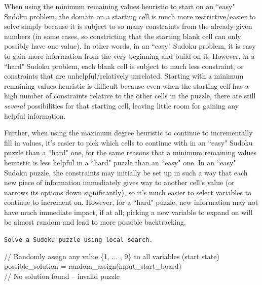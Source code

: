 \documentclass[12pt]{article}
\begin{document}
\begin{enumerate}[label=(\alph*)]
    When using the minimum remaining values heuristic to start on an ``easy" Sudoku problem, the domain on a starting cell is much more restrictive/easier to solve simply because it is subject to so many constraints from the already given numbers (in some cases, so constricting that the starting blank cell can only possibly have one value). In other words, in an ``easy" Sudoku problem, it is easy to gain more information from the very beginning and build on it. However, in a ``hard" Sudoku problem, each blank cell is subject to much less constraint, or constraints that are unhelpful/relatively unrelated. Starting with a minimum remaining values heuristic is difficult because even when the starting cell has a high number of constraints relative to the other cells in the puzzle, there are still \textit{several} possibilities for that starting cell, leaving little room for gaining any helpful information.

    Further, when using the maximum degree heuristic to continue to incrementally fill in values, it's easier to pick which cells to continue with in an ``easy" Sudoku puzzle than a ``hard" one, for the same reasons that a minimum remaining values heuristic is less helpful in a ``hard" puzzle than an ``easy" one. In an ``easy" Sudoku puzzle, the constraints may initially be set up in such a way that each new piece of information immediately gives way to another cell's value (or narrows its options down significantly), so it's much easier to select variables to continue to increment on. However, for a ``hard" puzzle, new information may not have much immediate impact, if at all; picking a new variable to expand on will be almost random and lead to more possible backtracking.

    \begin{algorithm}
        \caption{\texttt{Solve a Sudoku puzzle using local search.}}
        // Randomly assign any value \{1, ... , 9\} to all variables (start state) \\
        possible\_solution = random\_assign(input\_start\_board) \\
        // No solution found -- invalid puzzle \\
    \end{algorithm}
    

\end{enumerate}
\end{document}
